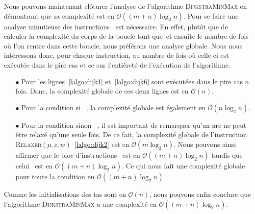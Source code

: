 Nous pouvons maintenant clôturer l'analyse de l'algorithme \textsc{DijkstraMinMax} en démontrant que sa complexité est en $\mathcal{O}((m+n)\log_2 n)$. Pour se faire une analyse minutieuse des instructions~ est nécessaire. En effet, plutôt que de calculer la complexité du corps de la boucle \og tant que\fg~et ensuite le nombre de fois où l'on rentre dans cette boucle, nous préférons une analyse globale. Nous nous intéressons donc, pour chaque instruction, au nombre de fois où celle-ci est exécutée dans le pire cas et ce sur l'entièreté de l'exécution de l'algorithme.

\begin{itemize}
	\item[$\bullet$] Pour les lignes~\ref{lalgo:dijk1} et~\ref{lalgo:dijk6} sont exécutées dans le pire cas $n$ fois. Donc, la complexité globale de ces deux lignes est en $\mathcal{O}(n)$.
	\item[$\bullet$] Pour la condition \og si \fg~, la complexité globale est également en   	 $\mathcal{O}(n \log_2 n)$.
	
	\item[$\bullet$] Pour la condition \og sinon \fg~, il est important de remarquer qu'un arc ne peut être relaxé qu'une seule fois. De ce fait, la complexité globale de l'instruction \textsc{Relaxer}$(p,s,w)$~\ref{lalgo:dijk2} est en $\mathcal{O}(m \log_2 n)$. Nous pouvons ainsi affirmer que le bloc d'instructions~ est en $\mathcal{O}((m+n) \log_2 n)$ tandis que celui~ est en $\mathcal{O}((m+n) \log_2 n)$. Ce qui nous fait une complexité globale pour toute la condition en $\mathcal{O}((m+n) \log_2 n)$
	
\end{itemize}

Comme les initialisations des tas sont en $\mathcal{O}(n)$, nous pouvons enfin conclure que l'algorithme \textsc{DijkstraMinMax} a une complexité en $\mathcal{O}((m+n) \log_2 n)$.
	


 
